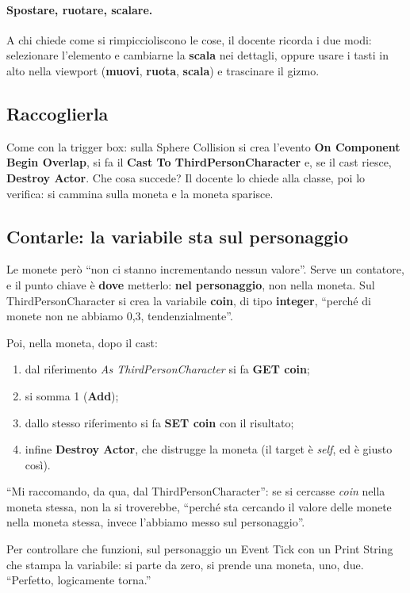 \paragraph{Spostare, ruotare, scalare.} A chi chiede come si rimpiccioliscono
le cose, il docente ricorda i due modi: selezionare l'elemento e cambiarne la
\textbf{scala} nei dettagli, oppure usare i tasti in alto nella viewport
(\textbf{muovi}, \textbf{ruota}, \textbf{scala}) e trascinare il gizmo.

\subsection{Raccoglierla}

Come con la trigger box: sulla Sphere Collision si crea l'evento
\textbf{On Component Begin Overlap}, si fa il \textbf{Cast To
ThirdPersonCharacter} e, se il cast riesce, \textbf{Destroy Actor}. Che cosa
succede? Il docente lo chiede alla classe, poi lo verifica: si cammina sulla
moneta e la moneta sparisce.

\subsection{Contarle: la variabile sta sul personaggio}

Le monete però ``non ci stanno incrementando nessun valore''. Serve un
contatore, e il punto chiave è \textbf{dove} metterlo: \textbf{nel
personaggio}, non nella moneta. Sul ThirdPersonCharacter si crea la variabile
\textbf{coin}, di tipo \textbf{integer}, ``perché di monete non ne abbiamo 0,3,
tendenzialmente''.

Poi, nella moneta, dopo il cast:
\begin{enumerate}
  \item dal riferimento \emph{As ThirdPersonCharacter} si fa \textbf{GET coin};
  \item si somma 1 (\textbf{Add});
  \item dallo stesso riferimento si fa \textbf{SET coin} con il risultato;
  \item infine \textbf{Destroy Actor}, che distrugge la moneta (il target è
        \emph{self}, ed è giusto così).
\end{enumerate}
``Mi raccomando, da qua, dal ThirdPersonCharacter'': se si cercasse
\emph{coin} nella moneta stessa, non la si troverebbe, ``perché sta cercando il
valore delle monete nella moneta stessa, invece l'abbiamo messo sul
personaggio''.

Per controllare che funzioni, sul personaggio un Event Tick con un Print
String che stampa la variabile: si parte da zero, si prende una moneta, uno,
due. ``Perfetto, logicamente torna.''

